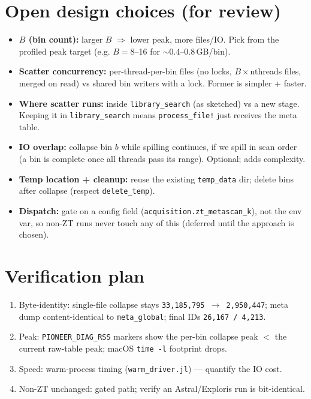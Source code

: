 \documentclass[11pt]{article}
\newcommand{\code}[1]{\texttt{\small #1}}
\begin{document}
\section{Open design choices (for review)}
\begin{itemize}[nosep]
  \item \textbf{\(B\) (bin count):} larger \(B\) \(\Rightarrow\) lower peak, more files/IO. Pick
    from the profiled peak target (e.g. \(B{=}8\)--16 for \(\sim\)0.4--0.8\,GB/bin).
  \item \textbf{Scatter concurrency:} per-thread-per-bin files (no locks, \(B\times\)nthreads
    files, merged on read) vs shared bin writers with a lock. Former is simpler + faster.
  \item \textbf{Where scatter runs:} inside \code{library\_search} (as sketched) vs a new stage.
    Keeping it in \code{library\_search} means \code{process\_file!} just receives the meta table.
  \item \textbf{IO overlap:} collapse bin \(b\) while spilling continues, if we spill in scan
    order (a bin is complete once all threads pass its range). Optional; adds complexity.
  \item \textbf{Temp location + cleanup:} reuse the existing \code{temp\_data} dir; delete bins
    after collapse (respect \code{delete\_temp}).
  \item \textbf{Dispatch:} gate on a config field (\code{acquisition.zt\_metascan\_k}), not the
    env var, so non-ZT runs never touch any of this (deferred until the approach is chosen).
\end{itemize}

\section{Verification plan}
\begin{enumerate}[nosep]
  \item Byte-identity: single-file collapse stays \code{33{,}185{,}795 \(\to\) 2{,}950{,}447};
    meta dump content-identical to \code{meta\_global}; final IDs \code{26{,}167 / 4{,}213}.
  \item Peak: \code{PIONEER\_DIAG\_RSS} markers show the per-bin collapse peak \(<\) the current
    raw-table peak; macOS \code{time -l} footprint drops.
  \item Speed: warm-process timing (\code{warm\_driver.jl}) --- quantify the IO cost.
  \item Non-ZT unchanged: gated path; verify an Astral/Exploris run is bit-identical.
\end{enumerate}
\end{document}
